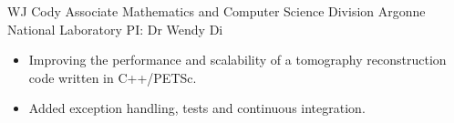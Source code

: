 
        {WJ Cody Associate}
        {\newline Mathematics and Computer Science Division}
        {Argonne National Laboratory}
        {PI: Dr Wendy Di}{
    \begin{itemize}
		\item Improving the performance and scalability of a tomography reconstruction code  written in C++/PETSc.
		\item Added exception handling, tests and continuous integration.
    \end{itemize}
	}


